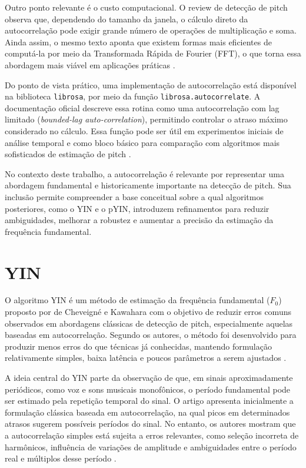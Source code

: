 Outro ponto relevante é o custo computacional. O review de detecção de pitch observa que, dependendo do tamanho da janela, o cálculo direto da autocorrelação pode exigir grande número de operações de multiplicação e soma. Ainda assim, o mesmo texto aponta que existem formas mais eficientes de computá-la por meio da Transformada Rápida de Fourier (FFT), o que torna essa abordagem mais viável em aplicações práticas \cite{delacuadra2007pitch}.

Do ponto de vista prático, uma implementação de autocorrelação está disponível na biblioteca \texttt{librosa}, por meio da função \texttt{librosa.autocorrelate}. A documentação oficial descreve essa rotina como uma autocorrelação com lag limitado (\textit{bounded-lag auto-correlation}), permitindo controlar o atraso máximo considerado no cálculo. Essa função pode ser útil em experimentos iniciais de análise temporal e como bloco básico para comparação com algoritmos mais sofisticados de estimação de pitch \cite{librosa_autocorrelate_docs}.

No contexto deste trabalho, a autocorrelação é relevante por representar uma abordagem fundamental e historicamente importante na detecção de pitch. Sua inclusão permite compreender a base conceitual sobre a qual algoritmos posteriores, como o YIN e o pYIN, introduzem refinamentos para reduzir ambiguidades, melhorar a robustez e aumentar a precisão da estimação da frequência fundamental.


\section{\label{sec:yin}YIN}

O algoritmo YIN é um método de estimação da frequência fundamental (\(F_0\)) proposto por de Cheveigné e Kawahara com o objetivo de reduzir erros comuns observados em abordagens clássicas de detecção de pitch, especialmente aquelas baseadas em autocorrelação. Segundo os autores, o método foi desenvolvido para produzir menos erros do que técnicas já conhecidas, mantendo formulação relativamente simples, baixa latência e poucos parâmetros a serem ajustados \cite{decheveigne2002yin}.

A ideia central do YIN parte da observação de que, em sinais aproximadamente periódicos, como voz e sons musicais monofônicos, o período fundamental pode ser estimado pela repetição temporal do sinal. O artigo apresenta inicialmente a formulação clássica baseada em autocorrelação, na qual picos em determinados atrasos sugerem possíveis períodos do sinal. No entanto, os autores mostram que a autocorrelação simples está sujeita a erros relevantes, como seleção incorreta de harmônicos, influência de variações de amplitude e ambiguidades entre o período real e múltiplos desse período \cite{decheveigne2002yin}.

